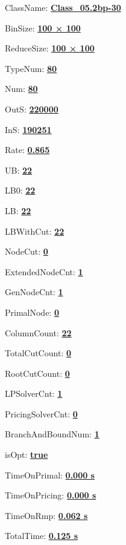 \documentclass[11pt]{article}
\begin{document}
\pagestyle{empty}


ClassName: \underline{\textbf{Class_05.2bp-30}}
\par
BinSize: \underline{\textbf{100 × 100}}
\par
ReduceSize: \underline{\textbf{100 × 100}}
\par
TypeNum: \underline{\textbf{80}}
\par
Num: \underline{\textbf{80}}
\par
OutS: \underline{\textbf{220000}}
\par
InS: \underline{\textbf{190251}}
\par
Rate: \underline{\textbf{0.865}}
\par
UB: \underline{\textbf{22}}
\par
LB0: \underline{\textbf{22}}
\par
LB: \underline{\textbf{22}}
\par
LBWithCut: \underline{\textbf{22}}
\par
NodeCut: \underline{\textbf{0}}
\par
ExtendedNodeCnt: \underline{\textbf{1}}
\par
GenNodeCnt: \underline{\textbf{1}}
\par
PrimalNode: \underline{\textbf{0}}
\par
ColumnCount: \underline{\textbf{22}}
\par
TotalCutCount: \underline{\textbf{0}}
\par
RootCutCount: \underline{\textbf{0}}
\par
LPSolverCnt: \underline{\textbf{1}}
\par
PricingSolverCnt: \underline{\textbf{0}}
\par
BranchAndBoundNum: \underline{\textbf{1}}
\par
isOpt: \underline{\textbf{true}}
\par
TimeOnPrimal: \underline{\textbf{0.000 s}}
\par
TimeOnPricing: \underline{\textbf{0.000 s}}
\par
TimeOnRmp: \underline{\textbf{0.062 s}}
\par
TotalTime: \underline{\textbf{0.125 s}}
\par
\newpage


\end{document}
